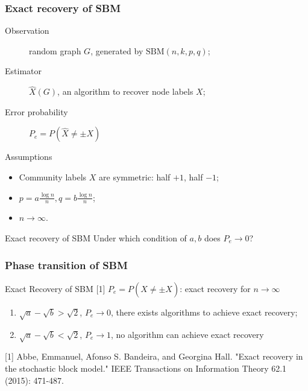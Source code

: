 \documentclass[notheorems]{beamer}
\begin{document}
\begin{frame}
\frametitle{Exact recovery of SBM}
\begin{description}
	\item[Observation] random graph $G$, generated by $\textrm{SBM}(n,k,p,q)$;
	\item[Estimator] $\hat{X}(G)$, an algorithm to recover node labels $X$;
	\item[Error probability] $P_e=P(\hat{X} \neq \pm X)$
\end{description}

\begin{block}{Assumptions}
	\begin{itemize}
	\item Community labels $X$ are symmetric: half $+1$, half $-1$;
	\item $p = a\frac{ \log n}{n}, q = b \frac{ \log n}{n}$;
	\item $n \to \infty$.
	\end{itemize}
\end{block}
\begin{block}{Exact recovery of SBM}
Under which condition of $a,b$ does $P_e \to 0$?
\end{block}
\end{frame}
\begin{frame}
\frametitle{Phase transition of SBM}
\begin{block}{Exact Recovery of SBM [1]}
	$P_e=P(\hat{X} \neq \pm X)$: exact recovery for $n \to \infty$
	\begin{enumerate}
		\item $\sqrt{a} - \sqrt{b} > \sqrt{2}$, $P_e \to 0$, there exists algorithms to achieve exact recovery;
		\item $\sqrt{a} - \sqrt{b} < \sqrt{2}$, $P_e \to 1$, no algorithm can achieve exact recovery
	\end{enumerate}
\end{block}
{\scriptsize [1]
Abbe, Emmanuel, Afonso S. Bandeira, and Georgina Hall. "Exact recovery in the stochastic block model." IEEE Transactions on Information Theory 62.1 (2015): 471-487.
}
\end{frame}
\end{document}
